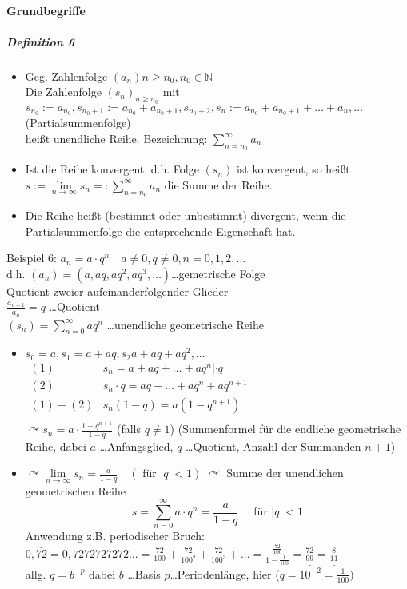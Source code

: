 \documentclass[a4paper]{scrartcl}
\begin{document}
\paragraph{Grundbegriffe}
\subparagraph{Definition 6}
\begin{itemize}
\item Geg. Zahlenfolge $(a_n) n \geq n_0, n_0 \in \mathbb{N}$\\
Die Zahlenfolge $(s_n)_{n\geq n_0}$ mit\\
$s_{n_0} := a_{n_0}, s_{n_0 +1} := a_{n_0} + a_{n_0 + 1}, s_{n_0 +2}, s_n := a_{n_0} + a_{n_0+1} + \dots + a_n , \dots$ (Partialsummenfolge)\\
heißt unendliche Reihe. Bezeichnung: $\sum\limits_{n=n_0}^{\infty} a_n$
\item Ist die Reihe konvergent, d.h. Folge $(s_n)$ ist konvergent, so heißt $s:= \lim\limits_{n\to \infty} s_n =: \sum\limits_{n=n_0}^{\infty} a_n$ die Summe der Reihe.
\item Die Reihe heißt (bestimmt oder unbestimmt) divergent, wenn die Partialsummenfolge die entsprechende Eigenschaft hat.
\end{itemize}

Beispiel 6: $a_n = a \cdot q^n \quad a \neq 0, q \neq 0, n=0,1,2,\dots$\\
d.h. $(a_n) = (a,aq,aq^2,aq^3,\dots)$\dots gemetrische Folge\\
Quotient zweier aufeinanderfolgender Glieder\\
$\frac{a_{n+1}}{a_n} = q$ \dots Quotient\\
$(s_n) = \sum\limits_{n=0}^{\infty} a q^n$ \dots unendliche geometrische Reihe
\begin{itemize}
\item $s_0 = a, s_1 = a + aq, s_2 a + aq +aq^2, \dots$\\
$\begin{array}{r|c}
(1) & s_n = a + aq + \dots + aq^n |\cdot q\\
(2) & s_n \cdot q = aq + \dots + aq^n + aq^{n+1}\\ \hline
(1)-(2) & s_n(1-q) = a(1-q^{n+1})\\
\end{array}$\\
$\curvearrowright s_n = a \cdot \frac{1-q^{n+1}}{1-q}$ (falls $q \neq 1$)
(Summenformel für die endliche geometrische Reihe, dabei $a$ \dots Anfangsglied, $q$ \dots Quotient, Anzahl der Summanden $n+1$)
\item $\curvearrowright \lim\limits_{n \to \infty} s_n = \frac{a}{1-q} \quad (\text{ für } \lvert q \rvert < 1)$
$\curvearrowright$ Summe der unendlichen geometrischen Reihe
\[ s = \sum\limits_{n=0}^{\infty} a \cdot q^n = \frac{a}{1-q} \quad \text{ für } \lvert q \rvert < 1\]
Anwendung z.B. periodischer Bruch: $0,\overline{72} = 0,7272727272... = \frac{72}{100} + \frac{72}{100^2} + \frac{72}{100^3} + ... = \frac{\frac{72}{100}}{1-\frac{1}{100}} = \underline{\underline{\frac{72}{99}}} = \underline{\underline{\frac{8}{11}}}$\\
allg. $q=b^{-p}$ dabei $b$ \dots Basis $p$\dots Periodenlänge, hier ($q=10^{-2} = \frac{1}{100})$
\end{itemize}
\end{document}
